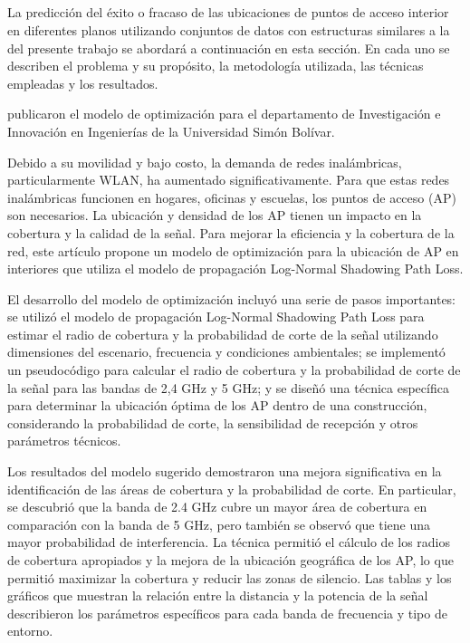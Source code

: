 \subsection{}
La predicción del éxito o fracaso de las ubicaciones de puntos de acceso interior en diferentes planos utilizando conjuntos de datos con estructuras similares a la del presente trabajo se abordará a continuación en esta sección. En cada uno se describen el problema y su propósito, la metodología utilizada, las técnicas empleadas y los resultados.

\cite{pr_contreras2021modelwlan} publicaron el modelo de optimización   para el departamento de Investigación e Innovación en Ingenierías de la Universidad Simón Bolívar.

Debido a su movilidad y bajo costo, la demanda de redes inalámbricas, particularmente WLAN, ha aumentado significativamente. Para que estas redes inalámbricas funcionen en hogares, oficinas y escuelas, los puntos de acceso (AP) son necesarios. La ubicación y densidad de los AP tienen un impacto en la cobertura y la calidad de la señal. Para mejorar la eficiencia y la cobertura de la red, este artículo propone un modelo de optimización para la ubicación de AP en interiores que utiliza el modelo de propagación Log-Normal Shadowing Path Loss.

El desarrollo del modelo de optimización incluyó una serie de pasos importantes: se utilizó el modelo de propagación Log-Normal Shadowing Path Loss para estimar el radio de cobertura y la probabilidad de corte de la señal utilizando dimensiones del escenario, frecuencia y condiciones ambientales; se implementó un pseudocódigo para calcular el radio de cobertura y la probabilidad de corte de la señal para las bandas de 2,4 GHz y 5 GHz; y se diseñó una técnica específica para determinar la ubicación óptima de los AP dentro de una construcción, considerando la probabilidad de corte, la sensibilidad de recepción y otros parámetros técnicos.

Los resultados del modelo sugerido demostraron una mejora significativa en la identificación de las áreas de cobertura y la probabilidad de corte. En particular, se descubrió que la banda de 2.4 GHz cubre un mayor área de cobertura en comparación con la banda de 5 GHz, pero también se observó que tiene una mayor probabilidad de interferencia. La técnica permitió el cálculo de los radios de cobertura apropiados y la mejora de la ubicación geográfica de los AP, lo que permitió maximizar la cobertura y reducir las zonas de silencio. Las tablas y los gráficos que muestran la relación entre la distancia y la potencia de la señal describieron los parámetros específicos para cada banda de frecuencia y tipo de entorno.

